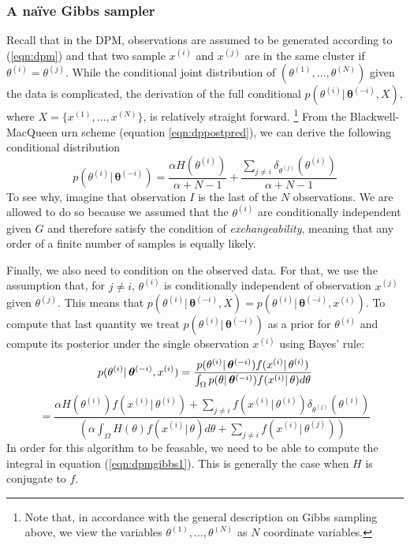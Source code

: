 \documentclass[final,3p,times,twocolumn]{elsarticle}
\let\bs\boldsymbol
\begin{document}
\subsubsection*{\normalfont \small \bfseries A na{\"i}ve Gibbs sampler}
Recall that in the DPM, observations are assumed to be generated according to (\ref{eqn:dpm}) and that two sample $x^{(i)}$ and $x^{(j)}$ are in the same cluster if $\theta^{(i)}=\theta^{(j)}$.
While the conditional joint distribution of $(\theta^{(1)},\dots,\theta^{(N)})$ given the data is complicated, the derivation of the full conditional $p(\theta^{(i)}|\,\bs\theta^{(-i)},X)$, where $X=\{x^{(1)},\dots,x^{(N)}\}$, is relatively straight forward.
\footnote{Note that, in accordance with the general description on Gibbs sampling above, we view the variables $\theta^{(1)},\dots,\theta^{(N)}$ as $N$ coordinate variables.}
From the Blackwell-MacQueen urn scheme (equation \ref{eqn:dppostpred}), we can derive the following conditional distribution
\begin{equation}
\label{eqn:dpmpostpred}
p(\theta^{(i)}|\,\bs\theta^{(-i)}) = \frac{\alpha H(\theta^{(i)})}{\alpha+N-1} +\frac{\sum_{j\neq i}\delta_{\theta^{(j)}}(\theta^{(i)})}{\alpha+N-1}
\end{equation}
To see why, imagine that observation $I$ is the last of the $N$ observations.
We are allowed to do so because we assumed that the $\theta^{(i)}$ are conditionally independent given $G$ and therefore satisfy the condition of \emph{exchangeability}, meaning that any order of a finite number of samples is equally likely.

Finally, we also need to condition on the observed data.
For that, we use the assumption that, for $j\neq i$, $\theta^{(i)}$ is conditionally independent of observation $x^{(j)}$ given $\theta^{(j)}$.
This means that $p(\theta^{(i)}|\,\bs\theta^{(-i)},X) = p(\theta^{(i)}|\,\bs\theta^{(-i)},x^{(i)})$.
To compute that last quantity we treat $p(\theta^{(i)}|\,\bs\theta^{(-i)})$ as a prior for $\theta^{(i)}$ and compute its posterior under the single observation $x^{(i)}$ using Bayes' rule:
\begin{equation}
\label{eqn:dpmgibbs1}
p(\theta^{(i)}|\,\bs\theta^{(-i)},x^{(i)}) = \frac{p(\theta^{(i)}|\,\bs\theta^{(-i)})f(x^{(i)}|\,\theta^{(i)})}{\int_\Omega p(\theta|\,\bs\theta^{(-i)})f(x^{(i)}|\,\theta) d\theta}\\
\end{equation}
\begin{equation*}
=\frac{\alpha H(\theta^{(i)})f(x^{(i)}|\,\theta^{(i)}) + \sum_{j\neq i}f(x^{(i)}|\,\theta^{(i)})\delta_{\theta^{(j)}}(\theta^{(i)})}{\left(\alpha\int_\Omega H(\theta)f(x^{(i)}|\,\theta)d\theta+\sum_{j \neq i}f(x^{(i)}|\,\theta^{(j)})\right)}
\end{equation*}
In order for this algorithm to be feasable, we need to be able to compute the integral in equation (\ref{eqn:dpmgibbs1}).
This is generally the case when $H$ is conjugate to $f$.
\end{document}
